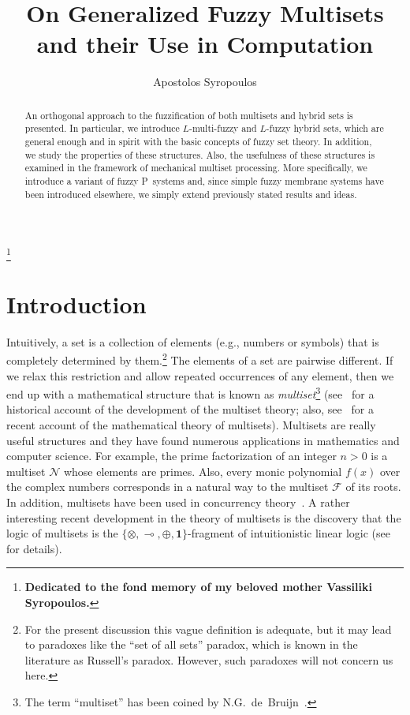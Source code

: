 \documentclass{amsart}
\theoremstyle{definition}
\begin{document}
\title{On Generalized Fuzzy Multisets and their Use in Computation}
\author{Apostolos Syropoulos}
\address{Greek Molecular Computing Group\\
        366, 28th October St.\\
        GR-671\ 00\ \ Xanthi\ GREECE}

\thanks{\textbf{Dedicated to the fond memory of my beloved mother Vassiliki Syropoulos.}\newline
{}
\newline{}}
\maketitle
\begin{abstract}
An orthogonal approach to the fuzzification of both multisets and hybrid
sets is presented. In particular, we introduce $L$-multi-fuzzy and 
$L$-fuzzy hybrid sets, which are general enough and in spirit with the
basic concepts of fuzzy set theory. In addition, we study the properties of
these structures. Also, the usefulness of these structures is examined in
the framework of mechanical multiset processing. More specifically, we 
introduce a variant of fuzzy P~systems and, since simple
fuzzy membrane systems have been introduced elsewhere, we simply extend
previously stated results and ideas.
\end{abstract}
\section{Introduction}
Intuitively, a set is a collection of elements (e.g., numbers or symbols) that
is completely determined by them.\footnote{For the present discussion this 
vague definition is adequate, but it may lead to paradoxes like the ``set of 
all sets'' paradox, which is known in the literature as Russell's paradox. 
However, such paradoxes will not concern us here.}  The elements of a set are 
pairwise different. If we relax this restriction and allow repeated 
occurrences of any element, then we end up with a mathematical structure that 
is known as {\em multiset}\footnote{The term ``multiset'' has been coined by 
N.G.~de~Bruijn~\cite{knuth81}.} (see~\cite{blizard91} for a historical account
of the development of the multiset theory; also, see~\cite{syropoulos01} for a
recent account of the mathematical theory of multisets). Multisets are really 
useful structures and they have found numerous applications in mathematics and 
computer science. For example, the prime factorization of an integer $n>0$ is 
a multiset $\mathcal{N}$ whose elements are primes. Also, every monic 
polynomial $f(x)$ over the complex numbers corresponds in a natural way to the
multiset $\mathcal{F}$ of its roots. In addition, multisets have been used in 
concurrency theory~\cite{deNicola96}. A rather interesting recent development
in the theory of multisets is the discovery that the logic of multisets is the
$\{\otimes,\multimap,\oplus,\mathbf{1}\}$-fragment of intuitionistic linear 
logic (see~\cite{tzouvaras98,tzouvaras03} for details).
\end{document}
